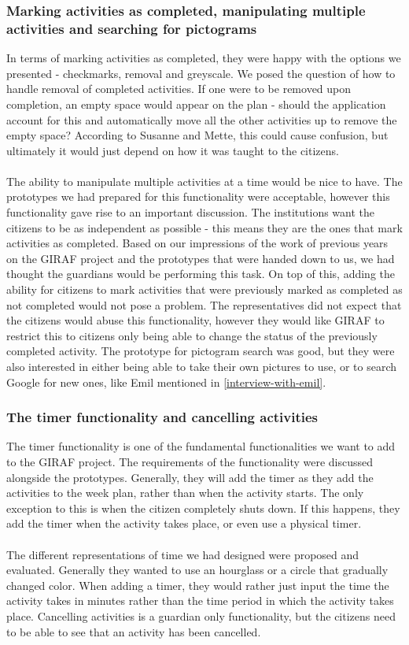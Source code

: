 \subsubsection{Marking activities as completed, manipulating multiple activities and searching for pictograms}
In terms of marking activities as completed, they were happy with the options we presented - checkmarks, removal and greyscale.
We posed the question of how to handle removal of completed activities.
If one were to be removed upon completion, an empty space would appear on the plan - should the application account for this and automatically move all the other activities up to remove the empty space?
According to Susanne and Mette, this could cause confusion, but ultimately it would just depend on how it was taught to the citizens.
\\\\
The ability to manipulate multiple activities at a time would be nice to have.
The prototypes we had prepared for this functionality were acceptable, however this functionality gave rise to an important discussion.
The institutions want the citizens to be as independent as possible - this means they are the ones that mark activities as completed.
Based on our impressions of the work of previous years on the GIRAF project and the prototypes that were handed down to us, we had thought the guardians would be performing this task.
On top of this, adding the ability for citizens to mark activities that were previously marked as completed as not completed would not pose a problem.
The representatives did not expect that the citizens would abuse this functionality, however they would like GIRAF to restrict this to citizens only being able to change the status of the previously completed activity.
The prototype for pictogram search was good, but they were also interested in either being able to take their own pictures to use, or to search Google for new ones, like Emil mentioned in \autoref{interview-with-emil}.

\subsubsection{The timer functionality and cancelling activities}
The timer functionality is one of the fundamental functionalities we want to add to the GIRAF project.
The requirements of the functionality were discussed alongside the prototypes.
Generally, they will add the timer as they add the activities to the week plan, rather than when the activity starts.
The only exception to this is when the citizen completely shuts down.
If this happens, they add the timer when the activity takes place, or even use a physical timer.
\\\\
The different representations of time we had designed were proposed and evaluated.
Generally they wanted to use an hourglass or a circle that gradually changed color.
When adding a timer, they would rather just input the time the activity takes in minutes rather than the time period in which the activity takes place.
Cancelling activities is a guardian only functionality, but the citizens need to be able to see that an activity has been cancelled.

